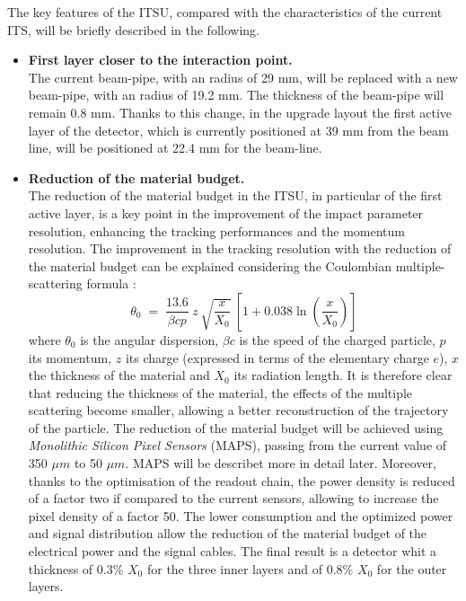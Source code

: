 \noindent
The key features of the ITSU, compared with the characteristics of the current ITS, will be briefly described in the following.
\begin{itemize}
 \item \textbf{First layer closer to the interaction point.}\\
 The current beam-pipe, with an radius of 29 mm, will be replaced with a new beam-pipe, with an radius of 19.2 mm. The thickness of the beam-pipe will remain 0.8 mm. Thanks to this change, in the upgrade layout the first active layer of the detector, which is currently positioned at 39 mm from the beam line,  will be positioned at 22.4 mm for the beam-line.
 \item \textbf{Reduction of the material budget.}\\
 The reduction of the material budget in the ITSU, in particular of the first active layer, is a key point in the improvement of the impact parameter resolution, enhancing the tracking performances and the momentum resolution. The improvement in the tracking resolution with the reduction of the material budget can be explained considering the Coulombian multiple-scattering formula \cite{pdg}:
 \begin{equation*}
  \theta_0 \; = \; \frac{13.6}{\beta c p } \: z \:  \sqrt{\frac{x}{X_0}} \: \left[1 + 0.038\ln\left(\frac{x}{X_0}\right)\right]
 \end{equation*}
 where $\theta_0$ is the angular dispersion, $\beta c$ is the speed of the charged particle, $p$ its momentum, $z$ its charge (expressed in terms of the elementary charge $e$), $x$ the thickness of the material and $X_0$ its radiation length. It is therefore clear that reducing the thickness of the material, the effects of the multiple scattering become smaller, allowing a better reconstruction of the trajectory of the particle. The reduction of the material budget will be achieved using \textit{Monolithic Silicon Pixel Sensors} (MAPS), passing from the current value of 350 $\mu m$ to 50 $\mu m$. MAPS will be describet more in detail later. Moreover, thanks to the optimisation of the readout chain, the power density is reduced of a factor two if compared to the current sensors, allowing to increase the pixel density of a factor 50. The lower consumption and the optimized power and signal distribution allow the reduction of the material budget of the electrical power and the signal cables. The final result is a detector whit a thickness of 0.3\% $X_0$ for the three inner layers and of 0.8\%  $X_0$ for the outer layers.

\end{itemize}
